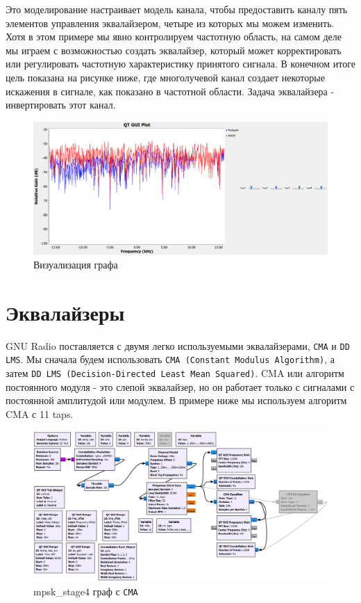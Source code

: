 \documentclass[a4paper,12pt]{report}
\begin{document}
Это моделирование настраивает модель канала, чтобы предоставить каналу пять элементов управления эквалайзером, четыре из которых мы можем изменить. Хотя в этом примере мы явно контролируем частотную область, на самом деле мы играем с возможностью создать эквалайзер, который может корректировать или регулировать частотную характеристику принятого сигнала. В конечном итоге цель показана на рисунке ниже, где многолучевой канал создает некоторые искажения в сигнале, как показано в частотной области. Задача эквалайзера - инвертировать этот канал.

\begin{figure}[H]
        \centering
        \includegraphics[width=1.0\textwidth]{21.png}
        \caption{Визуализация графа}
        \label{fig:lab12_fig4_2}
\end{figure}

\chapter{Эквалайзеры}

GNU Radio поставляется с двумя легко используемыми эквалайзерами, \texttt{CMA} и \texttt{DD LMS}. Мы сначала будем использовать \texttt{CMA (Constant Modulus Algorithm)}, а затем \texttt{DD LMS (Decision-Directed Least Mean Squared)}. CMA или алгоритм постоянного модуля - это слепой эквалайзер, но он работает только с сигналами с постоянной амплитудой или модулем. В примере ниже мы используем алгоритм CMA с 11 taps.

\begin{figure}[H]
        \centering
        \includegraphics[width=1.0\textwidth]{22.png}
        \caption{mpsk\_stage4 граф с \texttt{CMA}}
        \label{fig:lab12_fig5_1}
\end{figure}
\end{document}
